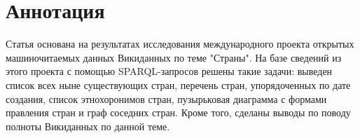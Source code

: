 \section{Аннотация}

Статья основана на результатах исследования международного проекта открытых машиночитаемых данных Викиданных по теме "Страны". На базе сведений из этого проекта с помощью SPARQL-запросов решены такие задачи: выведен список всех ныне существующих стран, перечень стран, упорядоченных по дате создания, список этнохоронимов стран, пузырьковая диаграмма с формами правления стран и граф соседних стран. Кроме того, сделаны выводы по поводу полноты Викиданных по данной теме.
